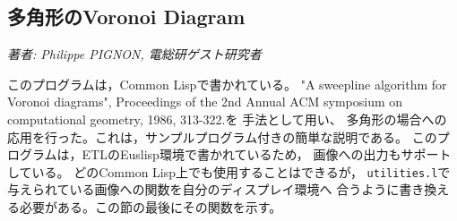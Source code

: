 \subsection{多角形のVoronoi Diagram}

\hfill {\em 著者: Philippe PIGNON, 電総研ゲスト研究者}

このプログラムは，Common Lispで書かれている。
 "A sweepline algorithm for Voronoi diagrams", Proceedings of
the 2nd Annual ACM symposium on computational geometry, 1986, 313-322.を
手法として用い、
多角形の場合への応用を行った。これは，サンプルプログラム付きの簡単な説明である。
このプログラムは，ETLのEuslisp環境で書かれているため，
画像への出力もサポートしている。
どのCommon Lisp上でも使用することはできるが，
{\tt utilities.l}で与えられている画像への関数を自分のディスプレイ環境へ
合うように書き換える必要がある。この節の最後にその関数を示す。

